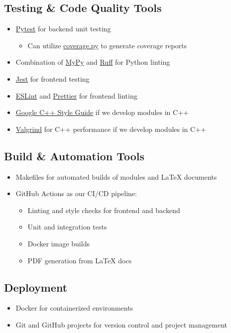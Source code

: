 \documentclass{article}
\begin{document}
\subsection*{Testing \& Code Quality Tools}
\begin{itemize}
    \item \href{https://pytest.org/}{Pytest} for backend unit testing
    \begin{itemize}
        \item Can utilize \href{https://coverage.readthedocs.io/}{coverage.py} to generate coverage reports
    \end{itemize}
    \item Combination of \href{https://mypy.readthedocs.io/}{MyPy} and \href{https://docs.astral.sh/ruff/}{Ruff} for Python linting
    \item \href{https://jestjs.io/}{Jest} for frontend testing
    \item \href{https://eslint.org/}{ESLint} and \href{https://prettier.io/}{Prettier} for frontend linting
    \item \href{https://google.github.io/styleguide/cppguide.html}{Google C++ Style Guide} if we develop modules in C++
    \item \href{https://valgrind.org/}{Valgrind} for C++ performance if we develop modules in C++
\end{itemize}

\subsection*{Build \& Automation Tools}
\begin{itemize}
    \item Makefiles for automated builds of modules and \LaTeX{} documents
    \item GitHub Actions as our CI/CD pipeline:
    \begin{itemize}
        \item Linting and style checks for frontend and backend
        \item Unit and integration tests
        \item Docker image builds
        \item PDF generation from \LaTeX{} docs
    \end{itemize}
\end{itemize}

\subsection*{Deployment}
\begin{itemize}
    \item Docker for containerized environments
    \item Git and GitHub projects for version control and project management
\end{itemize}
\end{document}
